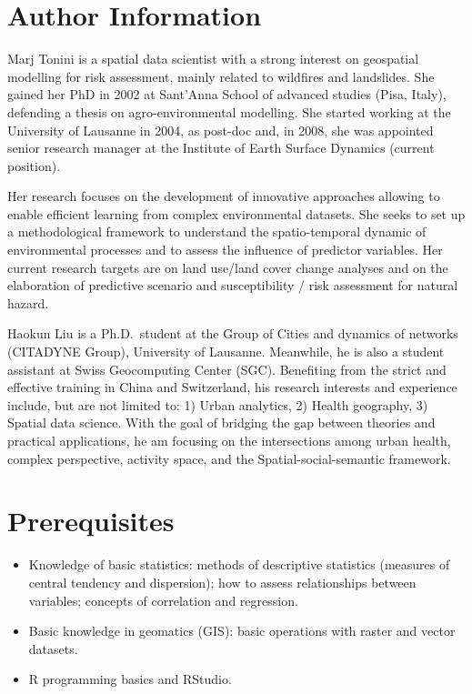\documentclass[
]{book}
\providecommand{\tightlist}{%
  \setlength{\itemsep}{0pt}\setlength{\parskip}{0pt}}
\begin{document}
\hypertarget{author-information}{%
\section*{Author Information}\label{author-information}}

Marj Tonini is a spatial data scientist with a strong interest on geospatial modelling for risk assessment, mainly related to wildfires and landslides. She gained her PhD in 2002 at Sant'Anna School of advanced studies (Pisa, Italy), defending a thesis on agro-environmental modelling. She started working at the University of Lausanne in 2004, as post-doc and, in 2008, she was appointed senior research manager at the Institute of Earth Surface Dynamics (current position).

Her research focuses on the development of innovative approaches allowing to enable efficient learning from complex environmental datasets. She seeks to set up a methodological framework to understand the spatio-temporal dynamic of environmental processes and to assess the influence of predictor variables. Her current research targets are on land use/land cover change analyses and on the elaboration of predictive scenario and susceptibility / risk assessment for natural hazard.

Haokun Liu is a Ph.D.~student at the Group of Cities and dynamics of networks (CITADYNE Group), University of Lausanne. Meanwhile, he is also a student assistant at Swiss Geocomputing Center (SGC). Benefiting from the strict and effective training in China and Switzerland, his research interests and experience include, but are not limited to: 1) Urban analytics, 2) Health geography, 3) Spatial data science. With the goal of bridging the gap between theories and practical applications, he am focusing on the intersections among urban health, complex perspective, activity space, and the Spatial-social-semantic framework.

\hypertarget{prerequisites}{%
\section*{Prerequisites}\label{prerequisites}}

\begin{itemize}
\tightlist
\item
  Knowledge of basic statistics: methods of descriptive statistics (measures of central tendency and dispersion); how to assess relationships between variables; concepts of correlation and regression.
\item
  Basic knowledge in geomatics (GIS): basic operations with raster and vector datasets.
\item
  R programming basics and RStudio.
\end{itemize}
\end{document}
